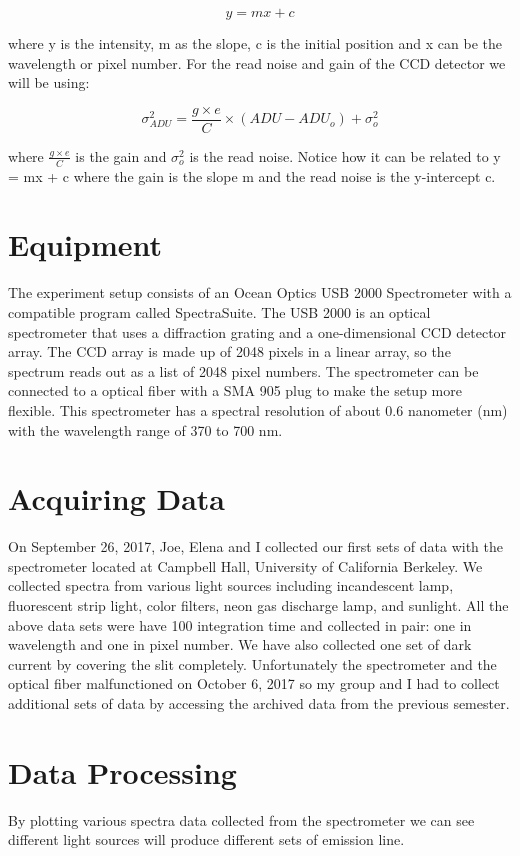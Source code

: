 \documentclass[onecolumn, 12pt, a4paper]{article}
\begin{document}
\[y = mx + c\] 

where y is the intensity, m as the slope, c is the initial position and x can be the wavelength or pixel number. For the read noise and gain of the CCD detector we will be using:

\[\sigma^2_{ADU} = \frac{g \times e}{C} \times (ADU - ADU_o) + \sigma^2_{o}\]

where $\frac{g \times e}{C}$ is the gain and $\sigma^2_{o}$ is the read noise. Notice how it can be related to y = mx + c where the gain is the slope m and the read noise is the y-intercept c. 

\section{Equipment} \label{Equipment}
The experiment setup consists of an Ocean Optics USB 2000 Spectrometer with a compatible program called SpectraSuite. The USB 2000 is an optical spectrometer that uses a diffraction grating and a one-dimensional CCD detector array. The CCD array is made up of 2048 pixels in a linear array, so the spectrum reads out as a list of 2048 pixel numbers. The spectrometer can be connected to a optical fiber with a SMA 905 plug to make the setup more flexible. This spectrometer has a spectral resolution of about 0.6 nanometer (nm) with the wavelength range of 370 to 700 nm. 

\section{Acquiring Data} \label{acquiring_data}
On September 26, 2017, Joe, Elena and I collected our first sets of data with the spectrometer located at Campbell Hall, University of California Berkeley. We collected spectra from various light sources including incandescent lamp, fluorescent strip light, color filters, neon gas discharge lamp, and sunlight. All the above data sets were have 100 integration time and collected in pair: one in wavelength and one in pixel number. We have also collected one set of dark current by covering the slit completely. Unfortunately the spectrometer and the optical fiber malfunctioned on October 6, 2017 so my group and I had to collect additional sets of data by accessing the archived data from the previous semester.

\section{Data Processing} \label{data_proccessing}
By plotting various spectra data collected from the spectrometer we can see different light sources will produce different sets of emission line. \newline
\end{document}
